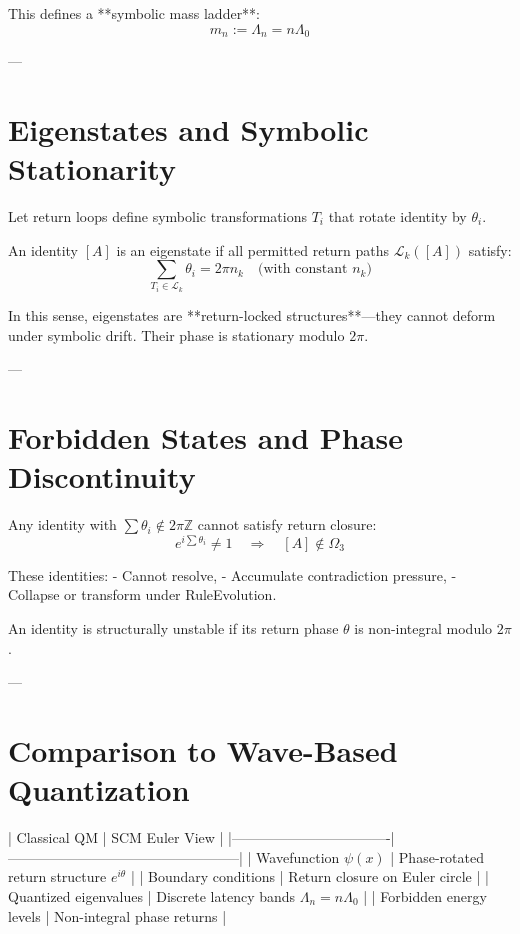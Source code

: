 This defines a **symbolic mass ladder**:
\[
m_n := \Lambda_n = n \Lambda_0
\]

---

\section{Eigenstates and Symbolic Stationarity}

Let return loops define symbolic transformations $T_i$ that rotate identity by $\theta_i$.

\begin{definition}
An identity $[A]$ is an eigenstate if all permitted return paths $\mathcal{L}_k([A])$ satisfy:
\[
\sum_{T_i \in \mathcal{L}_k} \theta_i = 2\pi n_k \quad \text{(with constant $n_k$)}
\]
\end{definition}

In this sense, eigenstates are **return-locked structures**—they cannot deform under symbolic drift. Their phase is stationary modulo $2\pi$.

---

\section{Forbidden States and Phase Discontinuity}

Any identity with $\sum \theta_i \notin 2\pi \mathbb{Z}$ cannot satisfy return closure:
\[
e^{i \sum \theta_i} \ne 1
\quad \Rightarrow \quad [A] \notin \Omega_3
\]

These identities:
- Cannot resolve,
- Accumulate contradiction pressure,
- Collapse or transform under RuleEvolution.

\begin{definition}
An identity is structurally unstable if its return phase $\theta$ is non-integral modulo $2\pi$.
\end{definition}

---

\section{Comparison to Wave-Based Quantization}

| Classical QM                      | SCM Euler View                                   |
|----------------------------------|--------------------------------------------------|
| Wavefunction $\psi(x)$           | Phase-rotated return structure $e^{i\theta}$     |
| Boundary conditions              | Return closure on Euler circle                   |
| Quantized eigenvalues            | Discrete latency bands $\Lambda_n = n\Lambda_0$ |
| Forbidden energy levels          | Non-integral phase returns                       |

